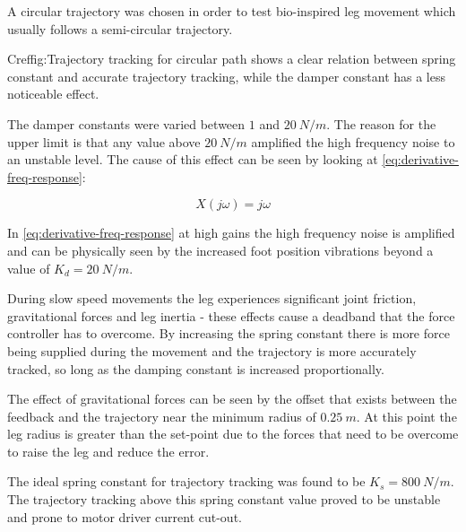 A circular trajectory was chosen in order to test bio-inspired leg movement which usually follows a semi-circular trajectory.

Cref{fig:Trajectory tracking for circular path} shows a clear relation between spring constant and accurate trajectory tracking, while the damper constant has a less noticeable effect.

The damper constants were varied between $1$ and $20\ N/m$. The reason for the upper limit is that any value above $20\ N/m$ amplified the high frequency noise to an unstable level. The cause of this effect can be seen by looking at \cref{eq:derivative-freq-response}:

\begin{equation} \label{eq:derivative-freq-response}
X(j\omega) = j\omega
\end{equation}

In \cref{eq:derivative-freq-response} at high gains the high frequency noise is amplified and can be physically seen by the increased foot position vibrations beyond a value of $K_d = 20\ N/m$.

During slow speed movements the leg experiences significant joint friction, gravitational forces and leg inertia - these effects cause a deadband that the force controller has to overcome. By increasing the spring constant there is more force being supplied during the movement and the trajectory is more accurately tracked, so long as the damping constant is increased proportionally.

The effect of gravitational forces can be seen by the offset that exists between the feedback and the trajectory near the minimum radius of $0.25\ m$. At this point the leg radius is greater than the set-point due to the forces that need to be overcome to raise the leg and reduce the error.

The ideal spring constant for trajectory tracking was found to be $K_s = 800\ N/m$. The trajectory tracking above this spring constant value proved to be unstable and prone to motor driver current cut-out.

